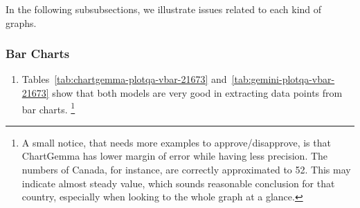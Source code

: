 \documentclass[
	letterpaper, %
]{jdf}
\begin{document}
       In the following subsubsections, we illustrate issues related to each kind of graphs.

\subsubsection{Bar Charts}\label{sssect:bar-errors}
\begin{enumerate}
  \item Tables~\ref{tab:chartgemma-plotqa-vbar-21673} and~\ref{tab:gemini-plotqa-vbar-21673} show that both models are very good in extracting data points from bar charts.
    \footnote{A small notice, that needs more examples to approve/disapprove, is that ChartGemma has lower margin of error while having less precision. The numbers of Canada, for instance, are correctly approximated to 52. This may indicate almost steady value, which sounds reasonable conclusion for that country, especially when looking to the whole graph at a glance.}
       \end{enumerate}
\end{document}
